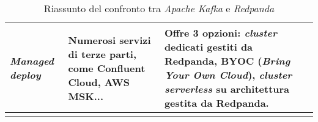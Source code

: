 \begin{longtable}{|>{\centering\arraybackslash}p{}|>{\centering\arraybackslash}p{}|>{\centering\arraybackslash}p{}|}
	\hline
	\textbf{\textit{Managed deploy}}     & Numerosi servizi di terze parti, come Confluent Cloud, AWS MSK...                                                                                           & Offre 3 opzioni: \textit{cluster} dedicati gestiti da Redpanda, BYOC (\textit{Bring Your Own Cloud}), \textit{cluster serverless} su architettura gestita da Redpanda.           \\
	\hline
	\caption{Riassunto del confronto tra \textit{Apache Kafka} e \textit{Redpanda}}
	\label{table:2}
\end{longtable}


